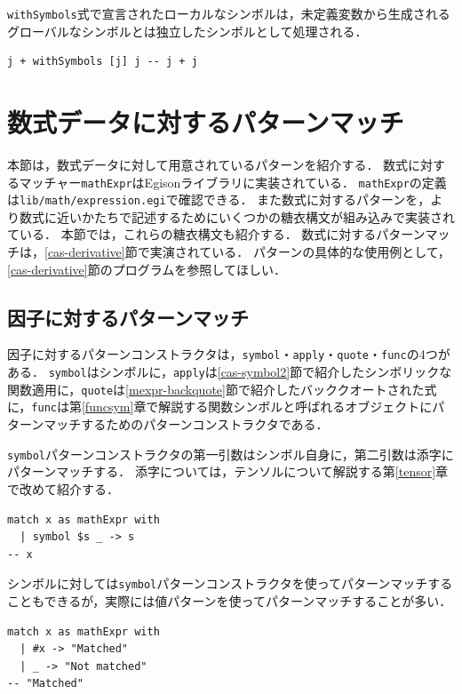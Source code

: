\lstinline{withSymbols}式で宣言されたローカルなシンボルは，未定義変数から生成されるグローバルなシンボルとは独立したシンボルとして処理される．
\begin{lstlisting}[language=egison,numbers=none]
j + withSymbols [j] j -- j + j
\end{lstlisting}

\section{数式データに対するパターンマッチ}\label{mexpr-pattern}

本節は，数式データに対して用意されているパターンを紹介する．
数式に対するマッチャー\lstinline{mathExpr}はEgisonライブラリに実装されている．
\lstinline{mathExpr}の定義は\texttt{lib/math/expression.egi}で確認できる．
また数式に対するパターンを，より数式に近いかたちで記述するためにいくつかの糖衣構文が組み込みで実装されている．
本節では，これらの糖衣構文も紹介する．
数式に対するパターンマッチは，\ref{cas-derivative}節で実演されている．
パターンの具体的な使用例として，\ref{cas-derivative}節のプログラムを参照してほしい．

\subsection{因子に対するパターンマッチ}

因子に対するパターンコンストラクタは，\lstinline{symbol}・\lstinline{apply}・\lstinline{quote}・\lstinline{func}の4つがある．
\lstinline{symbol}はシンボルに，\lstinline{apply}は\ref{cas-symbol2}節で紹介したシンボリックな関数適用に，\lstinline{quote}は\ref{mexpr-backquote}節で紹介したバッククオートされた式に，\lstinline{func}は第\ref{funcsym}章で解説する関数シンボルと呼ばれるオブジェクトにパターンマッチするためのパターンコンストラクタである．

\lstinline{symbol}パターンコンストラクタの第一引数はシンボル自身に，第二引数は添字にパターンマッチする．
添字については，テンソルについて解説する第\ref{tensor}章で改めて紹介する．
\begin{lstlisting}[language=egison,numbers=none]
match x as mathExpr with
  | symbol $s _ -> s
-- x
\end{lstlisting}
シンボルに対しては\lstinline{symbol}パターンコンストラクタを使ってパターンマッチすることもできるが，実際には値パターンを使ってパターンマッチすることが多い．
\begin{lstlisting}[language=egison,numbers=none]
match x as mathExpr with
  | #x -> "Matched"
  | _ -> "Not matched"
-- "Matched"
\end{lstlisting}

